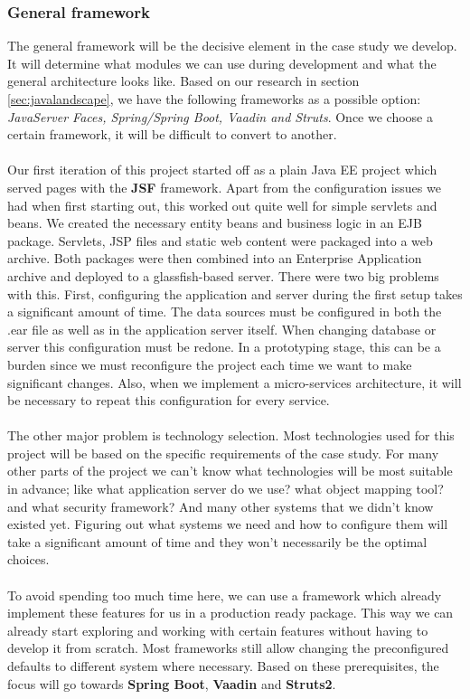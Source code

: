 \documentclass[12pt]{article}
\begin{document}
\begin{multicols}{2}
\subsubsection{General framework}\label{sec:framework}
The general framework will be the decisive element in the case study we develop. It will determine what modules we can use during development and what the general architecture looks like. Based on our research in section \ref{sec:javalandscape}, we have the following frameworks as a possible option: \textit{JavaServer Faces, Spring/Spring Boot, Vaadin and Struts}. Once we choose a certain framework, it will be difficult to convert to another. 
\\\\
Our first iteration of this project started off as a plain Java EE project which served pages with the \textbf{JSF} framework. Apart from the configuration issues we had when first starting out, this worked out quite well for simple servlets and beans. We created the necessary entity beans and business logic in an EJB package. Servlets, JSP files and static web content were packaged into a web archive. Both packages were then combined into an Enterprise Application archive and deployed to a glassfish-based server. There were two big problems with this. First, configuring the application and server during the first setup takes a significant amount of time. The data sources must be configured in both the .ear file as well as in the application server itself. When changing database or server this configuration must be redone. In a prototyping stage, this can be a burden since we must reconfigure the project each time we want to make significant changes. Also, when we implement a micro-services architecture, it will be necessary to repeat this configuration for every service. 
\\\\
The other major problem is technology selection. Most technologies used for this project will be based on the specific requirements of the case study. For many other parts of the project we can't know what technologies will be most suitable in advance; like what application server do we use? what object mapping tool? and what security framework? And many other systems that we didn't know existed yet. Figuring out what systems we need and how to configure them will take a significant amount of time and they won't necessarily be the optimal choices. 
\\\\
To avoid spending too much time here, we can use a framework which already implement these features for us in a production ready package. This way we can already start exploring and working with certain features without having to develop it from scratch. Most frameworks still allow changing the preconfigured defaults to different system where necessary. Based on these prerequisites, the focus will go towards \textbf{Spring Boot}, \textbf{Vaadin} and \textbf{Struts2}.

\end{multicols}
\end{document}
